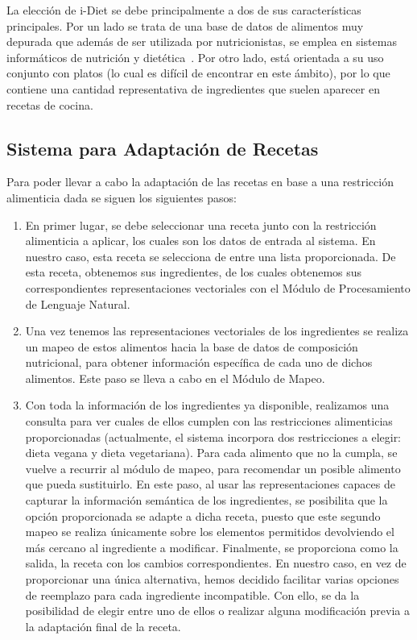La elección de i-Diet se debe principalmente a dos de sus características principales. Por un lado se trata de una base de datos de alimentos muy depurada que además de ser utilizada por nutricionistas, se emplea en sistemas informáticos de nutrición y dietética~\cite{iDietrf}. Por otro lado, está orientada a su uso conjunto con platos (lo cual es difícil de encontrar en este ámbito), por lo que contiene una cantidad representativa de ingredientes que suelen aparecer en recetas de cocina.


\subsection{Sistema para Adaptación de Recetas}

Para poder llevar a cabo la adaptación de las recetas en base a una restricción alimenticia dada se siguen los siguientes pasos:
\begin{enumerate}
    \item En primer lugar, se debe seleccionar una receta junto con la restricción alimenticia a aplicar, los cuales son los datos de entrada al sistema. En nuestro caso, esta receta se selecciona de entre una lista proporcionada. De esta receta, obtenemos sus ingredientes, de los cuales obtenemos sus correspondientes representaciones vectoriales con el Módulo de Procesamiento de Lenguaje Natural. 
    
    \item Una vez tenemos las representaciones vectoriales de los ingredientes se realiza un mapeo de estos alimentos hacia la base de datos de composición nutricional, para obtener información específica de cada uno de dichos alimentos. Este paso se lleva a cabo en el Módulo de Mapeo.
    
    \item Con toda la información de los ingredientes ya disponible, realizamos una consulta para ver cuales de ellos cumplen con las restricciones alimenticias proporcionadas (actualmente, el sistema incorpora dos restricciones a elegir: dieta vegana y dieta vegetariana). Para cada alimento que no la cumpla, se vuelve a recurrir al módulo de mapeo, para recomendar un posible alimento que pueda sustituirlo. En este paso, al usar las representaciones capaces de capturar la información semántica de los ingredientes, se posibilita que la opción proporcionada se adapte a dicha receta, puesto que este segundo mapeo se realiza únicamente sobre los elementos permitidos devolviendo el más cercano al ingrediente a modificar. Finalmente, se proporciona como la salida, la receta con los cambios correspondientes. En nuestro caso, en vez de proporcionar una única alternativa, hemos decidido facilitar varias opciones de reemplazo para cada ingrediente incompatible. Con ello, se da la posibilidad de elegir entre uno de ellos o realizar alguna modificación previa a la adaptación final de la receta. 
\end{enumerate}


